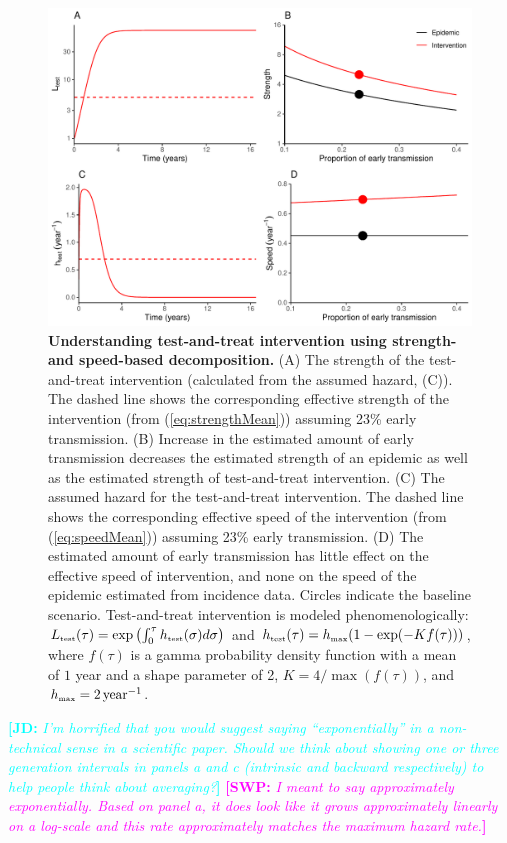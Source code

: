 \documentclass[12pt]{article}
\newcommand{\comment}[3]{\textcolor{#1}{\textbf{[#2: }\textit{#3}\textbf{]}}}
\newcommand{\jd}[1]{\comment{cyan}{JD}{#1}}
\newcommand{\swp}[1]{\comment{magenta}{SWP}{#1}}
\newcommand{\tsub}[2]{#1_{{\textrm{\tiny #2}}}}
\newcommand{\figlab}[1]{\label{fig:#1}}
\newcommand{\eqref}[1]{(\ref{eq:#1})}
\begin{document}
\begin{figure}[!t]
\includegraphics[width=\textwidth]{../figure/test_and_treat.pdf}
\caption{
\textbf{Understanding test-and-treat intervention using strength- and speed-based decomposition.}
(A) The strength of the test-and-treat intervention (calculated from the assumed hazard, (C)). The dashed line shows the corresponding effective strength of the intervention (from \eqref{strengthMean}) assuming 23\% early transmission.
(B) Increase in the estimated amount of early transmission decreases the estimated strength of an epidemic as well as the estimated strength of test-and-treat intervention.
(C) The assumed hazard for the test-and-treat intervention. 
The dashed line shows the corresponding effective speed of the intervention (from \eqref{speedMean}) assuming 23\% early transmission.
(D) The estimated amount of early transmission has little effect on the effective speed of intervention, and none on the speed of the epidemic estimated from incidence data.
Circles indicate the baseline scenario.
Test-and-treat intervention is modeled phenomenologically: $\tsub{L}{test}(\tau) = \exp\left(\int_0^\tau \tsub{h}{test}(\sigma) d\sigma \right)$ and $\tsub{h}{test}(\tau) = \tsub{h}{max} (1 - \exp(- K f(\tau)))$, where $f(\tau)$ is a gamma probability density function with a mean of $1$ year and a shape parameter of 2, $K = 4/\max(f(\tau))$, and $\tsub{h}{max} = 2\,\mathrm{year}^{-1}$.
}
\figlab{test}
\end{figure}

\jd{I'm horrified that you would suggest saying ``exponentially'' in a non-technical sense in a scientific paper. Should we think about showing one or three generation intervals in panels a and c (intrinsic and backward respectively) to help people think about averaging?}
\swp{I meant to say approximately exponentially. Based on panel a, it does look like it grows approximately linearly on a log-scale and this rate approximately matches the maximum hazard rate.}
\end{document}
